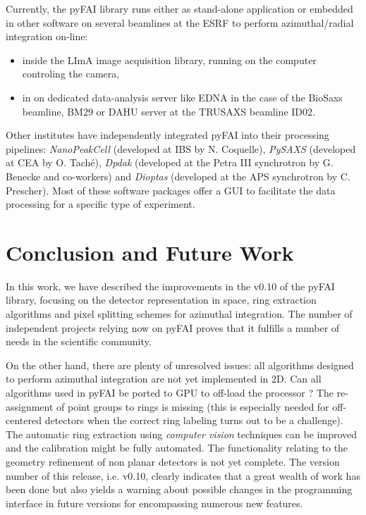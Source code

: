 \documentclass[preprint]{iucr}
\begin{document}
Currently, the pyFAI library runs either as stand-alone application or
embedded in other software on several beamlines at the ESRF to perform
azimuthal/radial integration on-line:
\begin{itemize}
  \item inside the LImA image acquisition library, running on the
  computer controling the camera,
  \item in on dedicated data-analysis server like EDNA \cite{edna} in the case
  of the BioSaxs beamline, BM29 \cite{bm29} or DAHU server at the TRUSAXS
  beamline ID02.
\end{itemize}

Other institutes have independently integrated pyFAI into their processing
pipelines: \textit{NanoPeakCell} (developed at IBS by N. Coquelle),
\textit{PySAXS} (developed at CEA by O. Taché), \textit{Dpdak} (developed
at the Petra III synchrotron by G. Benecke and co-workers) \cite{dpdak}
and \textit{Dioptas} (developed at the APS synchrotron by C. Prescher).
Most of these software packages offer a GUI to facilitate the
data processing for a specific type of experiment.

\section{Conclusion and Future Work}

In this work, we have described the improvements in the
v0.10 of the pyFAI library, focusing on the detector representation in space, ring
extraction algorithms and pixel splitting schemes for azimuthal integration.
The number of independent projects relying now on pyFAI proves that it fulfills a
number of needs in the scientific community.

On the other hand, there are plenty of unresolved issues: all
algorithms designed to perform azimuthal integration are not yet implemented in
2D.
Can all algorithms used in pyFAI be ported to GPU to off-load the processor ?
The re-assignment of point groups to rings is missing (this is
especially needed for off-centered detectors when the correct ring labeling
turns out to be a challenge).
The automatic ring extraction using \textit{computer vision} techniques can
be improved and the calibration might be fully automated.
The functionality relating to the geometry refinement of non planar
detectors is not yet complete.
The version number of this release, i.e. v0.10, clearly indicates that a great
wealth of work has been done but also yields a warning about possible changes
in the programming interface in future versions for encompassing numerous new
features.
\end{document}
